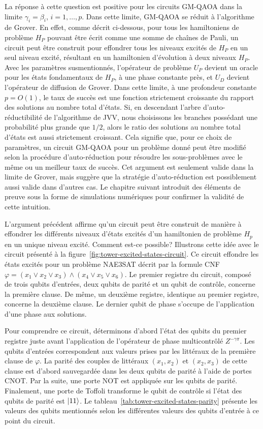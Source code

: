 La réponse à cette question est positive pour les circuits GM-QAOA dans la limite $\gamma_{i}=\beta_{i}$, $i=1,\dots,p$. Dans cette limite, GM-QAOA se réduit à l'algorithme de Grover. En effet, comme décrit ci-dessous, pour tous les hamiltoniens de problème $H_{P}$ pouvant être écrit comme une somme de chaînes de Pauli, un circuit peut être construit pour effondrer tous les niveaux excités de $H_{P}$ en un seul niveau excité, résultant en un hamiltonien d'évolution à deux niveaux $H_{P}$. Avec les paramètres susmentionnés, l'opérateur de problème $U_{P}$ devient un oracle pour les états fondamentaux de $H_{P}$, à une phase constante près, et $U_{D}$ devient l'opérateur de diffusion de Grover. Dans cette limite, à une profondeur constante $p=O(1)$, le taux de succès est une fonction strictement croissante du rapport des solutions au nombre total d'états. Si, en descendant l'arbre d'auto-réductibilité de l'algorithme de JVV, nous choisissons les branches possédant une probabilité plus grande que $1/2$, alors le ratio des solutions au nombre total d'états est aussi strictement croissant. Cela signifie que, pour ce choix de paramètres, un circuit GM-QAOA pour un problème donné peut être modifié selon la procédure d'auto-réduction pour résoudre les sous-problèmes avec le même ou un meilleur taux de succès. Cet argument est seulement valide dans la limite de Grover, mais suggère que la stratégie d'auto-réduction est possiblement aussi valide dans d'autres cas. Le chapitre suivant introduit des éléments de preuve sous la forme de simulations numériques pour confirmer la validité de cette intuition.

L'argument précédent affirme qu'un circuit peut être construit de manière à effondrer les différents niveaux d'états excités d'un hamiltonien de problème $H_{p}$ en un unique niveau excité. Comment est-ce possible? Illustrons cette idée avec le circuit présenté à la figure~\ref{fig:tower-excited-states-circuit}. Ce circuit effondre les états excités pour un problème NAE3SAT décrit par la formule CNF $\varphi = (x_{1} \lor x_{2} \lor x_{3}) \land (x_{4} \lor x_{5} \lor x_{6})$. Le premier registre du circuit, composé de trois qubits d'entrées, deux qubits de parité et un qubit de contrôle, concerne la première clause. De même, un deuxième registre, identique au premier registre, concerne la deuxième clause. Le dernier qubit de phase s'occupe de l'application d'une phase aux solutions.

Pour comprendre ce circuit, déterminons d'abord l'état des qubits du premier registre juste avant l'application de l'opérateur de phase multicontrôlé $Z^{-\gamma \pi}$. Les qubits d'entrées correspondent aux valeurs prises par les littéraux de la première clause de $\varphi$. La parité des couples de littéraux $(x_{1}, x_{2})$ et $(x_{2}, x_{3})$ de cette clause est d'abord sauvegardée dans les deux qubits de parité à l'aide de portes CNOT. Par la suite, une porte NOT est appliquée sur les qubits de parité. Finalement, une porte de Toffoli transforme le qubit de contrôle si l'état des qubits de parité est $\ket{11}$. Le tableau~\ref{tab:tower-excited-states-parity} présente les valeurs des qubits mentionnés selon les différentes valeurs des qubits d'entrée à ce point du circuit.

